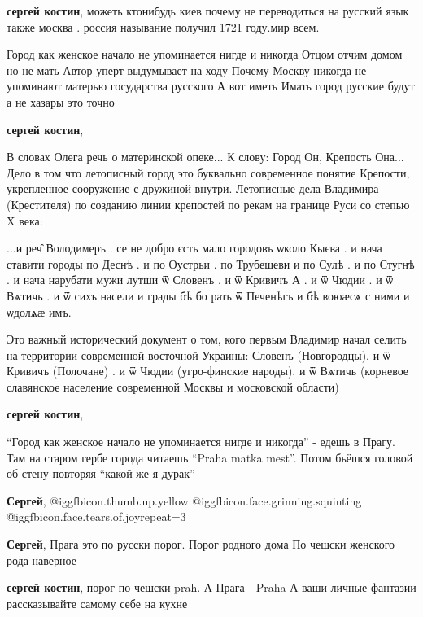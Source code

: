 \begin{itemize}
\begin{itemize}
\textbf{сергей костин}, можеть ктонибудь киев почему не переводиться на русский язык также москва . россия называние получил 1721 году.мир всем.
\end{itemize} %


Город как женское начало не упоминается нигде и никогда Отцом отчим домом но не
мать Автор уперт выдумывает на ходу Почему Москву никогда не упоминают матерью
государства русского А вот иметь Имать город русские будут а не хазары это
точно

\begin{itemize} %
\textbf{сергей костин}, 

В словах Олега речь о материнской опеке... К слову: Город Он, Крепость
Она... Дело в том что летописный город это буквально современное понятие
Крепости, укрепленное сооружение с дружиной внутри. Летописные дела Владимира
(Крестителя) по созданию линии крепостей по рекам на границе Руси со степью X
века:

...и реч̑ Володимеръ . се не добро єсть мало городовъ ѡколо Кыєва . и нача
ставити городы по Деснѣ . и по Оустрьи . по Трубешеви и по Сулѣ . и по Стугнѣ .
и нача нарубати мужи лутши ѿ Словенъ . и ѿ Кривичъ А . и ѿ Чюдии . и ѿ Вѧтичь .
и ѿ сихъ насели и грады бѣ бо рать ѿ Печенѣгъ и бѣ воюӕсѧ с ними и ѡдолѧӕ имъ.

Это важный исторический документ о том, кого первым Владимир начал селить на
территории современной восточной Украины: Словенъ (Новгородцы). и ѿ Кривичъ
(Полочане) . и ѿ Чюдии (угро-финские народы). и ѿ Вѧтичь (корневое славянское
население современной Москвы и московской области)

\textbf{сергей костин},

\enquote{Город как женское начало не упоминается нигде и никогда} - едешь в Прагу. Там
на старом гербе города читаешь \enquote{Praha matka mest}. Потом бьёшся головой об
стену повторяя \enquote{какой же я дурак}

\textbf{Сергей},  @igg{fbicon.thumb.up.yellow}  @igg{fbicon.face.grinning.squinting}  @igg{fbicon.face.tears.of.joy}{repeat=3} 

\textbf{Сергей}, Прага это по русски порог. Порог родного дома По чешски женского рода наверное

\textbf{сергей костин}, порог по-чешски prah. А Прага - Praha
А ваши личные фантазии рассказывайте самому себе на кухне


\end{itemize}
\end{itemize}
